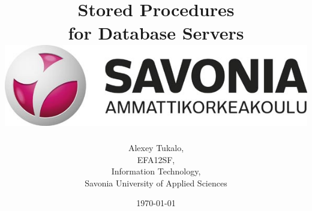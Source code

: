 \documentclass[english]{article}
\date{}
\begin{document}
\title{\vspace{2in}Stored Procedures\\
\small for Database Servers\\
\vspace{0.5in}\includegraphics{savonia.jpg}}

\nopagebreak
\maketitle


\vspace{3in}

\author{
\begin{flushright}
Alexey Tukalo,\\
EFA12SF,\\
Information Technology,\\
Savonia University of Applied Sciences
\end{flushright}
}

\date{\today}
\thispagestyle{empty}

\newpage
\setcounter{page}{1}
\setcounter{tocdepth}{2}

\end{document}
